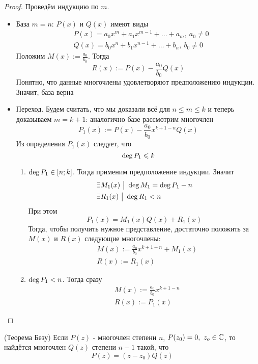 \begin{proof}
	Проведём индукцию по $m$.
	\begin{itemize}
		\item База $m = n$: $P(x)$ и $Q(x)$ имеют виды
		\begin{align*}
			&{P(x) = a_0 x^m + a_1 x^{m - 1} + \ldots + a_m,\ a_0 \neq 0}
			\\
			&{Q(x) = b_0 x^n + b_1 x^{n - 1} + \ldots + b_n,\ b_0 \neq 0}
		\end{align*}
		Положим $M(x) := \frac{a_0}{b_0}$. Тогда 
		\[
			R(x) := P(x) - \frac{a_0}{b_0}Q(x)
		\]
		Понятно, что данные многочлены удовлетворяют предположению индукции. Значит, база верна
		
		\item Переход. Будем считать, что мы доказали всё для $n \le m \le k$ и теперь доказываем $m = k + 1$: аналогично базе рассмотрим многочлен
		\[
			P_1(x) := P(x) - \frac{a_0}{b_0}x^{k + 1 - n} Q(x)
		\]
		Из определения $P_1(x)$ следует, что
		\[
			\operatorname{deg} P_1 \leqslant k
		\]
		\begin{enumerate}
			\item $\operatorname{deg} P_1 \in [n; k]$. Тогда применим предположение индукции. Значит
			\begin{align*}
				&{\exists M_1(x) \ \big|\  \operatorname{deg} M_1 = \operatorname{deg} P_1 - n}
				\\
				&{\exists R_1(x) \ \big|\  \operatorname{deg} R_1 < n}
			\end{align*}
			При этом
			\[
				P_1(x) = M_1(x)Q(x) + R_1(x)
			\]
			Тогда, чтобы получить нужное представление, достаточно положить за $M(x)$ и $R(x)$ следующие многочлены:
			\begin{align*}
				&{M(x) := \frac{a_0}{b_0}x^{k + 1 - n} + M_1(x)}
				\\
				&{R(x) := R_1(x)}
			\end{align*}
			
			\item $\operatorname{deg} P_1 < n$. Тогда сразу
			\begin{align*}
			&{M(x) := \frac{a_0}{b_0}x^{k + 1 - n}}
			\\
			&{R(x) := P_1(x)}
			\end{align*}
		\end{enumerate}
	\end{itemize}
\end{proof}

\begin{theorem} (Теорема Безу)
	Если $P(z)$ - многочлен степени $n$, $P(z_0) = 0,\ z_o \in \mathbb{C}$, то найдётся многочлен $Q(z)$ степени $n - 1$ такой, что
	\[
		P(z) = (z - z_0)Q(z)
	\]
\end{theorem}

